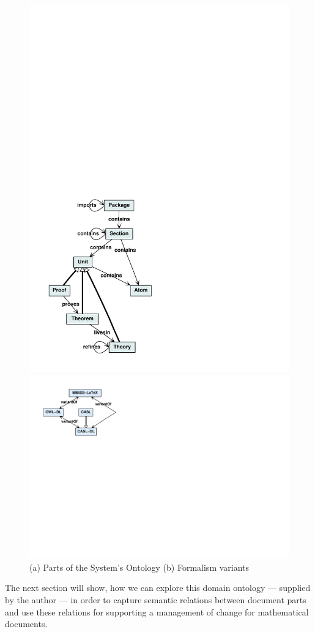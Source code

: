   \begin{figure}[t]
    \begin{minipage}[b]{.6\textwidth}
      \includegraphics[width=.5\textwidth]{projects/semrelations/systems_onto_short}
    \end{minipage}
    \hspace*{-1cm}
    \begin{minipage}[b]{.4\textwidth}
      \includegraphics[width=1.1\textwidth]{projects/semrelations/onto_formalisms}
  \end{minipage}
  \caption{(a) Parts of the System's Ontology (b) Formalism variants}\label{fig:semrel-systems_onto}
\end{figure}

The next section will show, how we can explore this domain ontology --- supplied by the
author --- in order to capture semantic relations between document parts and use these
relations for supporting a management of change for mathematical documents.

